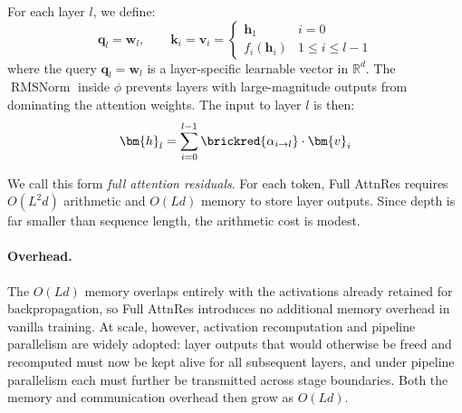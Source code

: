 For each layer $l$, we define:
\begin{equation}
    \label{eq:qkvattn}
    \bm{q}_{l} = \bm{w}_{l}, \quad
    \quad \bm{k}_{i} = \bm{v}_{i} = \begin{cases} \bm{h}_1 & i = 0 \\ f_i(\bm{h}_{i}) & 1 \leq i \leq l-1 \end{cases}
\end{equation}
where the query $\bm{q}_l=\bm{w}_{l}$ is a layer-specific learnable vector in $\mathbb{R}^{d}$. The $\operatorname{RMSNorm}$ inside $\phi$ prevents layers with large-magnitude outputs from dominating the attention weights. The input to layer $l$ is then:
\begin{equation}
    \label{eq:full-attn}
    \bm{h}_{l} = \sum_{i=0}^{l-1} \brickred{\alpha_{i \to l}} \cdot \bm{v}_{i}
\end{equation}





We call this form \emph{full attention residuals}. For each token, Full AttnRes requires $O(L^2 d)$ arithmetic and $O(Ld)$ memory to store layer outputs. Since depth is far smaller than sequence length, the arithmetic cost is modest.

\paragraph{Overhead.}
The $O(Ld)$ memory overlaps entirely with the activations already retained for backpropagation, so Full AttnRes introduces no additional memory overhead in vanilla training. At scale, however, activation recomputation and pipeline parallelism are widely adopted: layer outputs that would otherwise be freed and recomputed must now be kept alive for all subsequent layers, and under pipeline parallelism each must further be transmitted across stage boundaries. Both the memory and communication overhead then grow as $O(Ld)$.

